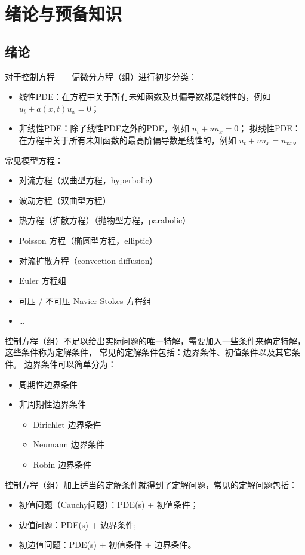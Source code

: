 \chapter{绪论与预备知识}


\section{绪论}


对于控制方程——偏微分方程（组）进行初步分类：
\begin{itemize}
    \item 线性PDE：在方程中关于所有未知函数及其偏导数都是线性的，例如 $u_t + a(x,t) u_x = 0$；
    \item 非线性PDE：除了线性PDE之外的PDE，例如 $u_t + u u_x = 0$；
          拟线性PDE：在方程中关于所有未知函数的最高阶偏导数是线性的，例如 $u_t + u u_x = u_{xx}$。
\end{itemize}
常见模型方程：
\begin{itemize}
    \item 对流方程（双曲型方程，hyperbolic）
    \item 波动方程（双曲型方程）
    \item 热方程（扩散方程）（抛物型方程，parabolic）
    \item Poisson 方程（椭圆型方程，elliptic）
    \item 对流扩散方程（convection-diffusion）
    \item Euler 方程组
    \item 可压 / 不可压 Navier-Stokes 方程组
    \item \dots
\end{itemize}


控制方程（组）不足以给出实际问题的唯一特解，需要加入一些条件来确定特解，这些条件称为定解条件，
常见的定解条件包括：边界条件、初值条件以及其它条件。
边界条件可以简单分为：
\begin{itemize}
    \item 周期性边界条件
    \item 非周期性边界条件
          \begin{itemize}
              \item[(a)] Dirichlet 边界条件
              \item[(b)] Neumann 边界条件
              \item[(c)] Robin 边界条件
          \end{itemize}
\end{itemize}
控制方程（组）加上适当的定解条件就得到了定解问题，常见的定解问题包括：
\begin{itemize}
    \item 初值问题（Cauchy问题）：PDE(s) + 初值条件；
    \item 边值问题：PDE(s) + 边界条件;
    \item 初边值问题：PDE(s) + 初值条件 + 边界条件。
\end{itemize}


